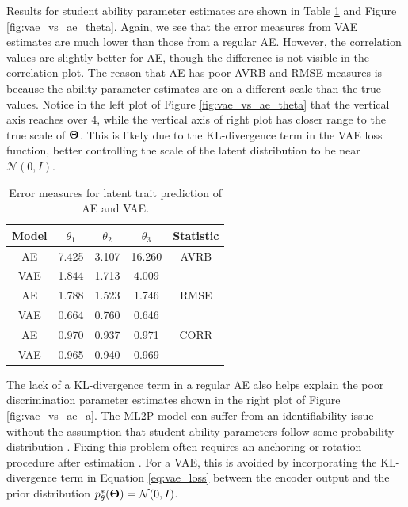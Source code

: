 Results for student ability parameter estimates are shown in Table \ref{tab:vae_vs_ae_theta} and Figure \ref{fig:vae_vs_ae_theta}. Again, we see that the error measures from VAE estimates are much lower than those from a regular AE. However, the correlation values are slightly better for AE, though the difference is not visible in the correlation plot. The reason that AE has poor AVRB and RMSE measures is because the ability parameter estimates are on a different scale than the true values. Notice in the left plot of Figure \ref{fig:vae_vs_ae_theta} that the vertical axis reaches over $4$, while the vertical axis of right plot has closer range to the true scale of $\boldsymbol{\Theta}$. This is likely due to the KL-divergence term in the VAE loss function, better controlling the scale of the latent distribution to be near $\mathcal{N}(0,I)$.

\begin{table}[h!]
\centering
\begin{tabular}{ccccc}
\hline
Model & $\theta_1$ & $\theta_2$ & $\theta_3$ & Statistic \\
\hline
AE &  7.425 & 3.107 & 16.260 & AVRB \\
VAE   & 1.844 & 1.713 & 4.009 &  \\
\hline
AE & 1.788 & 1.523 & 1.746 & RMSE \\
VAE   & 0.664 & 0.760 & 0.646 & \\
\hline
AE & 0.970 & 0.937 & 0.971 & CORR \\
VAE   & 0.965 & 0.940 & 0.969 & \\
\hline
\end{tabular}
\caption{Error measures for latent trait prediction of AE and VAE.}
\label{tab:vae_vs_ae_theta}
\end{table}

The lack of a KL-divergence term in a regular AE also helps explain the poor discrimination parameter estimates shown in the right plot of Figure \ref{fig:vae_vs_ae_a}. The ML2P model can suffer from an identifiability issue without the assumption that student ability parameters follow some probability distribution \cite{ets2005}. Fixing this problem often requires an anchoring or rotation procedure after estimation \cite{baker_kim2004}. For a VAE, this is avoided by incorporating the KL-divergence term in Equation \ref{eq:vae_loss} between the encoder output and the prior distribution $p_\theta^*(\boldsymbol{\Theta}) = \mathcal{N}(0,I)$.

